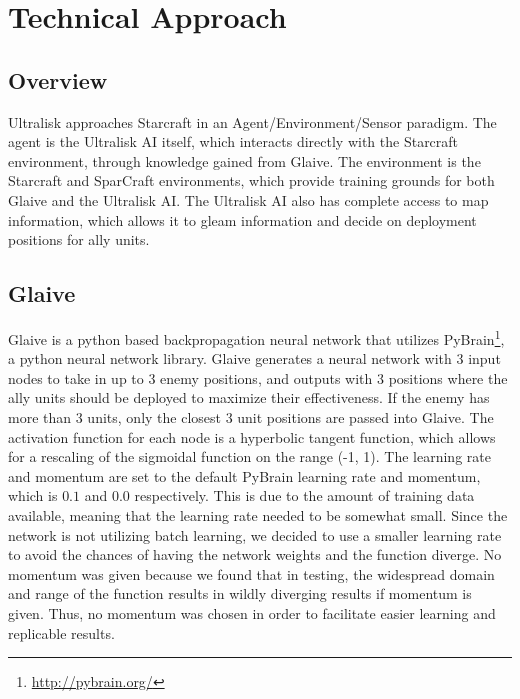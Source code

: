 \documentclass[twocolumn]{article}
\begin{document}
\section{Technical Approach}
\subsection{Overview} 
Ultralisk approaches Starcraft in an Agent/Environment/Sensor paradigm. The agent is the Ultralisk AI itself, which interacts directly with the Starcraft environment, through knowledge gained from Glaive. The environment is the Starcraft and SparCraft environments, which provide training grounds for both Glaive and the Ultralisk AI. The Ultralisk AI also has complete access to map information, which allows it to gleam information and decide on deployment positions for ally units. 
\subsection{Glaive}
Glaive is a python based backpropagation neural network that utilizes PyBrain\footnote{\tiny{\url{http://pybrain.org/}}}, a python neural network library. 
Glaive generates a neural network with 3 input nodes to take in up to 3 enemy positions, and outputs with 3 positions where the ally units should be deployed to maximize their effectiveness. If the enemy has more than 3 units, only the closest 3 unit positions are passed into Glaive. The activation function for each node is a hyperbolic tangent function, which allows for a rescaling of the sigmoidal function on the range (-1, 1). The learning rate and momentum are set to the default PyBrain learning rate and momentum, which is $0.1$ and $0.0$ respectively. This is due to the amount of training data available, meaning that the learning rate needed to be somewhat small. Since the network is not utilizing batch learning, we decided to use a smaller learning rate to avoid the chances of having the network weights and the function diverge. No momentum was given because we found that in testing, the widespread domain and range of the function results in wildly diverging results if momentum is given. Thus, no momentum was chosen in order to facilitate easier learning and replicable results. 
\end{document}
